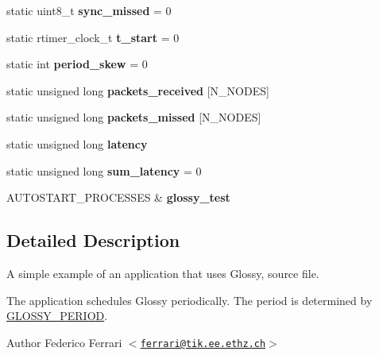 \begin{DoxyCompactItemize}
\item 
\hypertarget{group__glossy-test-variables_ga60cbfbbe9faa75c911015ad30087933f}{
static uint8\_\-t {\bfseries sync\_\-missed} = 0}
\label{group__glossy-test-variables_ga60cbfbbe9faa75c911015ad30087933f}

\item 
\hypertarget{group__glossy-test-variables_gac9559510e6d21818f3566cd7429aaca8}{
static rtimer\_\-clock\_\-t {\bfseries t\_\-start} = 0}
\label{group__glossy-test-variables_gac9559510e6d21818f3566cd7429aaca8}

\item 
\hypertarget{group__glossy-test-variables_ga6168dc578395ee973d219267d7bf97b5}{
static int {\bfseries period\_\-skew} = 0}
\label{group__glossy-test-variables_ga6168dc578395ee973d219267d7bf97b5}

\item 
\hypertarget{group__glossy-test-variables_ga070670d7c9c0eef4f960390e87897155}{
static unsigned long {\bfseries packets\_\-received} \mbox{[}N\_\-NODES\mbox{]}}
\label{group__glossy-test-variables_ga070670d7c9c0eef4f960390e87897155}

\item 
\hypertarget{group__glossy-test-variables_ga0292ef1538f2a9553288cff4752f4e80}{
static unsigned long {\bfseries packets\_\-missed} \mbox{[}N\_\-NODES\mbox{]}}
\label{group__glossy-test-variables_ga0292ef1538f2a9553288cff4752f4e80}

\item 
\hypertarget{group__glossy-test-variables_gaad9aca10bbb196083acdc1981d5502b5}{
static unsigned long {\bfseries latency}}
\label{group__glossy-test-variables_gaad9aca10bbb196083acdc1981d5502b5}

\item 
\hypertarget{group__glossy-test-variables_gac156624836ae9355d8f554bf0969254b}{
static unsigned long {\bfseries sum\_\-latency} = 0}
\label{group__glossy-test-variables_gac156624836ae9355d8f554bf0969254b}

\item 
\hypertarget{group__glossy-test-init_ga32cc397a384ec81c0310150a939756f7}{
AUTOSTART\_\-PROCESSES \& {\bfseries glossy\_\-test}}
\label{group__glossy-test-init_ga32cc397a384ec81c0310150a939756f7}

\end{DoxyCompactItemize}


\subsection{Detailed Description}
A simple example of an application that uses Glossy, source file.

The application schedules Glossy periodically. The period is determined by \hyperlink{group__glossy-test-settings_ga6f68058577fdbfccbd8e50537609a5e4}{GLOSSY\_\-PERIOD}. \begin{DoxyAuthor}{Author}
Federico Ferrari $<$\href{mailto:ferrari@tik.ee.ethz.ch}{\tt ferrari@tik.ee.ethz.ch}$>$ 
\end{DoxyAuthor}
